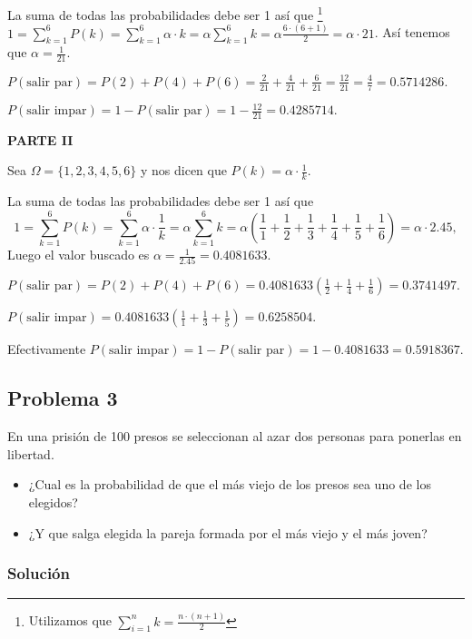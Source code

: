 \documentclass[
]{article}
\providecommand{\tightlist}{%
  \setlength{\itemsep}{0pt}\setlength{\parskip}{0pt}}
\begin{document}
La suma de todas las probabilidades debe ser 1 así que
\footnote{Utilizamos que
$\sum_{i=1}^n k=\frac{n\cdot (n+1)}{2}$ }
\(1=\sum_{k=1}^6 P(k)=\sum_{k=1}^6 \alpha \cdot k= \alpha \sum_{k=1}^6 k = \alpha \frac{6\cdot (6+1)}{2}=\alpha\cdot 21\).
Así tenemos que \(\alpha=\frac{1}{21}.\)

\(P(\mbox{salir par})= P(2)+P(4)+P(6)=\frac{2}{21}+\frac{4}{21}+\frac{6}{21}=\frac{12}{21}=\frac{4}{7}=0.5714286.\)

\(P(\mbox{salir impar})= 1- P(\mbox{salir par})=1-\frac{12}{21}=0.4285714.\)

\textbf{PARTE II}

Sea \(\Omega=\{1,2,3,4,5,6\}\) y nos dicen que
\(P(k)= \alpha\cdot \frac{1}{k}\).

La suma de todas las probabilidades debe ser 1 así que \[
1=\sum_{k=1}^6 P(k)=\sum_{k=1}^6 \alpha \cdot \frac{1}{k}=
\alpha \sum_{k=1}^6 k = \alpha \left(\frac{1}{1}+\frac{1}{2}+\frac{1}{3}+\frac{1}{4}+\frac{1}{5}+\frac{1}{6}\right)=\alpha\cdot 2.45,
\] Luego el valor buscado es \(\alpha=\frac{1}{2.45}=0.4081633\).

\(P(\mbox{salir par})= P(2)+P(4)+P(6)=0.4081633\left(\frac{1}{2}+\frac{1}{4}+\frac{1}{6}\right)=0.3741497.\)

\(P(\mbox{salir impar})= 0.4081633\left(\frac{1}{1}+\frac{1}{3}+\frac{1}{5}\right)=0.6258504.\)

Efectivamente
\(P(\mbox{salir impar})=1-P(\mbox{salir par})=1- 0.4081633=0.5918367.\)

\hypertarget{problema-3}{%
\subsection{Problema 3}\label{problema-3}}

En una prisión de 100 presos se seleccionan al azar dos personas para
ponerlas en libertad.

\begin{itemize}
\tightlist
\item
  ¿Cual es la probabilidad de que el más viejo de los presos sea uno de
  los elegidos?
\item
  ¿Y que salga elegida la pareja formada por el más viejo y el más
  joven?
\end{itemize}

\hypertarget{soluciuxf3n-3}{%
\subsubsection{Solución}\label{soluciuxf3n-3}}
\end{document}

